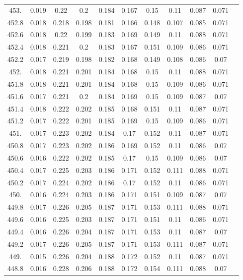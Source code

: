 \documentclass[12pt]{ctexart}
\numberwithin{equation}{section}
\begin{document}
\begin{longtable}{ccccccccccc}
453.	&	0.019	&	0.22	&	0.2	&	0.184	&	0.167	&	0.15	&	0.11	&	0.087	&	0.071	\\
452.8	&	0.018	&	0.218	&	0.198	&	0.181	&	0.166	&	0.148	&	0.107	&	0.085	&	0.071	\\
452.6	&	0.018	&	0.22	&	0.199	&	0.183	&	0.169	&	0.149	&	0.11	&	0.088	&	0.071	\\
452.4	&	0.018	&	0.221	&	0.2	&	0.183	&	0.167	&	0.151	&	0.109	&	0.086	&	0.071	\\
452.2	&	0.017	&	0.219	&	0.198	&	0.182	&	0.168	&	0.149	&	0.108	&	0.086	&	0.07	\\
452.	&	0.018	&	0.221	&	0.201	&	0.184	&	0.168	&	0.15	&	0.11	&	0.088	&	0.071	\\
451.8	&	0.018	&	0.221	&	0.201	&	0.184	&	0.168	&	0.15	&	0.109	&	0.086	&	0.071	\\
451.6	&	0.017	&	0.221	&	0.2	&	0.184	&	0.169	&	0.15	&	0.109	&	0.087	&	0.07	\\
451.4	&	0.018	&	0.222	&	0.202	&	0.185	&	0.168	&	0.151	&	0.11	&	0.087	&	0.071	\\
451.2	&	0.017	&	0.222	&	0.201	&	0.185	&	0.169	&	0.15	&	0.109	&	0.086	&	0.071	\\
451.	&	0.017	&	0.223	&	0.202	&	0.184	&	0.17	&	0.152	&	0.11	&	0.087	&	0.071	\\
450.8	&	0.017	&	0.223	&	0.202	&	0.186	&	0.169	&	0.152	&	0.11	&	0.086	&	0.07	\\
450.6	&	0.016	&	0.222	&	0.202	&	0.185	&	0.17	&	0.15	&	0.109	&	0.086	&	0.07	\\
450.4	&	0.017	&	0.225	&	0.203	&	0.186	&	0.171	&	0.152	&	0.111	&	0.088	&	0.071	\\
450.2	&	0.017	&	0.224	&	0.202	&	0.186	&	0.17	&	0.152	&	0.11	&	0.086	&	0.071	\\
450.	&	0.016	&	0.224	&	0.203	&	0.186	&	0.171	&	0.151	&	0.109	&	0.087	&	0.07	\\
449.8	&	0.017	&	0.226	&	0.205	&	0.187	&	0.171	&	0.153	&	0.111	&	0.088	&	0.071	\\
449.6	&	0.016	&	0.225	&	0.203	&	0.187	&	0.171	&	0.151	&	0.11	&	0.086	&	0.071	\\
449.4	&	0.016	&	0.226	&	0.204	&	0.187	&	0.171	&	0.153	&	0.11	&	0.087	&	0.07	\\
449.2	&	0.017	&	0.226	&	0.205	&	0.187	&	0.171	&	0.153	&	0.111	&	0.087	&	0.071	\\
449.	&	0.015	&	0.226	&	0.204	&	0.188	&	0.172	&	0.152	&	0.11	&	0.087	&	0.071	\\
448.8	&	0.016	&	0.228	&	0.206	&	0.188	&	0.172	&	0.154	&	0.111	&	0.088	&	0.07	\\

\end{longtable}
\end{document}
